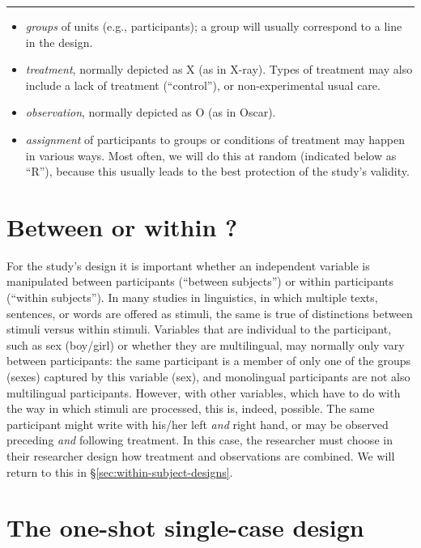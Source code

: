 \documentclass[
]{book}
\begin{document}
\begin{center}\rule{0.5\linewidth}{0.5pt}\end{center}

\begin{itemize}
\item
  \emph{groups} of units (e.g., participants); a group will usually correspond to a line in the design.
\item
  \emph{treatment}, normally depicted as X (as in X-ray). Types of treatment may also include a lack of treatment (``control''), or non-experimental usual care.
\item
  \emph{observation}, normally depicted as O (as in Oscar).
\item
  \emph{assignment} of participants to groups or conditions of treatment may happen in various ways. Most often, we will do this at random (indicated below as ``R''), because this usually leads to the best protection of the study's validity.
\end{itemize}

\section{Between or within ?}\label{sec:betweenwithinparticipants}

For the study's design it is important whether an independent variable is manipulated between participants (``between subjects'') or within participants (``within subjects''). In many studies in linguistics, in which multiple texts, sentences, or words are offered as stimuli, the same is true of distinctions between stimuli versus within stimuli. Variables that are individual to the participant, such as sex (boy/girl) or whether they are multilingual, may normally only vary between participants: the same participant is a member of only one of the groups (sexes) captured by this variable (sex), and monolingual participants are not also multilingual participants. However, with other variables, which have to do with the way in which stimuli are processed, this is, indeed, possible. The same participant might write with his/her left \emph{and} right hand, or may be observed preceding \emph{and} following treatment. In this case, the researcher must choose in their researcher design how treatment and observations are combined. We will return to this in §\ref{sec:within-subject-designs}.

\section{The one-shot single-case design}\label{sec:one-shot-single-case-design}
\end{document}
